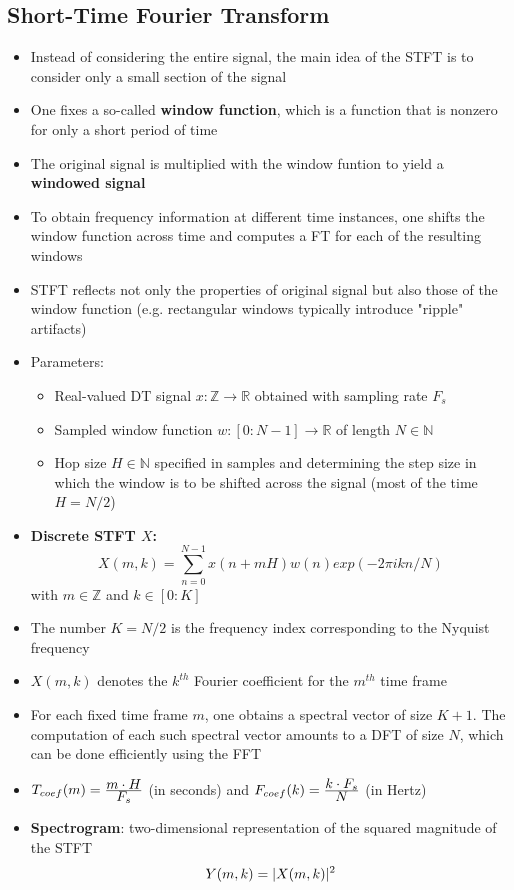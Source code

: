 \subsection{Short-Time Fourier Transform}
\begin{itemize}
    \item
        Instead of considering the entire signal, the main idea of the STFT is to consider only a small section of the signal 
    \item
        One fixes a so-called \textbf{window function}, which is a function that is nonzero for only a short period of time
    \item
        The original signal is multiplied with the window funtion to yield a \textbf{windowed signal}
    \item
        To obtain frequency information at different time instances, one shifts the window function across time and computes a FT for each of the resulting windows
    \item
        STFT reflects not only the properties of original signal but also those of the window function (e.g. rectangular windows typically introduce "ripple" artifacts)
    \item
        Parameters:
        \begin{itemize}
            \item
                Real-valued DT signal $x: \mathbb{Z} \rightarrow \mathbb{R}$ obtained with sampling rate $F_s$
            \item
                Sampled window function $w: [0:N-1] \rightarrow \mathbb{R}$ of length $N \in \mathbb{N}$
            \item
                Hop size $H \in \mathbb{N}$ specified in samples and determining the step size in which the window is to be shifted across the signal (most of the time $H = N/2$)
        \end{itemize}
    \item
        \textbf{Discrete STFT $X$:}
        $$X(m,k) = \sum_{n=0}^{N-1} x(n+mH)w(n)exp(-2\pi i k n/N)$$
        with $m \in \mathbb{Z}$ and $k \in [0:K]$
    \item
        The number $K = N/2$ is the frequency index corresponding to the Nyquist frequency
    \item
        $X(m,k)$ denotes the $k^{th}$ Fourier coefficient for the $m^{th}$ time frame
    \item
        For each fixed time frame $m$, one obtains a spectral vector of size $K+1$. The computation of each such spectral vector amounts to a DFT of size $N$, which can be done efficiently using the FFT
    \item
        $T_{coef}(m) = \frac{\displaystyle m \cdot H}{\displaystyle F_s}$ (in seconds) and $F_{coef}(k) = \frac{\displaystyle k \cdot F_s}{\displaystyle N}$ (in Hertz)
    \item
        \textbf{Spectrogram}: two-dimensional representation of the squared magnitude of the STFT
        $$Y(m,k) = \lvert X(m,k)\rvert^2$$
\end{itemize}
